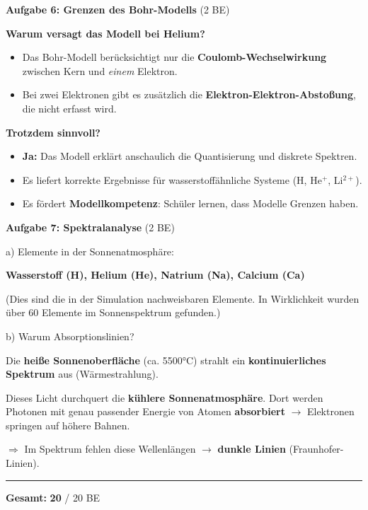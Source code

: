 \documentclass[11pt,a4paper]{article}
\begin{document}

\textbf{Aufgabe 6: Grenzen des Bohr-Modells} \hfill (2 BE)

\begin{tcolorbox}[loesungbox]
\textbf{Warum versagt das Modell bei Helium?}
\begin{itemize}[noitemsep,topsep=2pt]
\item Das Bohr-Modell berücksichtigt nur die \textbf{Coulomb-Wechselwirkung} zwischen Kern und \emph{einem} Elektron.
\item Bei zwei Elektronen gibt es zusätzlich die \textbf{Elektron-Elektron-Abstoßung}, die nicht erfasst wird.
\end{itemize}

\textbf{Trotzdem sinnvoll?}
\begin{itemize}[noitemsep,topsep=2pt]
\item \textbf{Ja:} Das Modell erklärt anschaulich die Quantisierung und diskrete Spektren.
\item Es liefert korrekte Ergebnisse für wasserstoffähnliche Systeme (H, He$^+$, Li$^{2+}$).
\item Es fördert \textbf{Modellkompetenz}: Schüler lernen, dass Modelle Grenzen haben.
\end{itemize}
\end{tcolorbox}


\textbf{Aufgabe 7: Spektralanalyse} \hfill (2 BE)

a) Elemente in der Sonnenatmosphäre:

\begin{tcolorbox}[loesungbox]
\textbf{Wasserstoff (H), Helium (He), Natrium (Na), Calcium (Ca)}

(Dies sind die in der Simulation nachweisbaren Elemente. In Wirklichkeit wurden über 60 Elemente im Sonnenspektrum gefunden.)
\end{tcolorbox}

b) Warum Absorptionslinien?

\begin{tcolorbox}[loesungbox]
Die \textbf{heiße Sonnenoberfläche} (ca. 5500°C) strahlt ein \textbf{kontinuierliches Spektrum} aus (Wärmestrahlung).

Dieses Licht durchquert die \textbf{kühlere Sonnenatmosphäre}. Dort werden Photonen mit genau passender Energie von Atomen \textbf{absorbiert} $\to$ Elektronen springen auf höhere Bahnen.

$\Rightarrow$ Im Spektrum fehlen diese Wellenlängen $\to$ \textbf{dunkle Linien} (Fraunhofer-Linien).
\end{tcolorbox}

\vfill

\begin{center}
\rule{10cm}{0.5pt}

\textbf{Gesamt:} \textcolor{loesung}{\textbf{20}} / 20 BE
\end{center}
\end{document}

